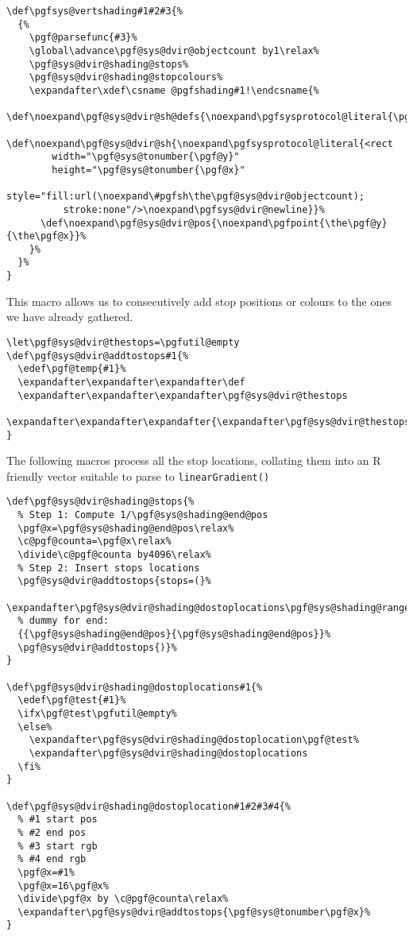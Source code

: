 \documentclass[]{article}
\begin{document}
\begin{verbatim}
\def\pgfsys@vertshading#1#2#3{%
  {%
    \pgf@parsefunc{#3}%
    \global\advance\pgf@sys@dvir@objectcount by1\relax%
    \pgf@sys@dvir@shading@stops%
    \pgf@sys@dvir@shading@stopcolours%
    \expandafter\xdef\csname @pgfshading#1!\endcsname{%
      \def\noexpand\pgf@sys@dvir@sh@defs{\noexpand\pgfsysprotocol@literal{\pgf@sys@dvir@thestops}}%
      \def\noexpand\pgf@sys@dvir@sh{\noexpand\pgfsysprotocol@literal{<rect
        width="\pgf@sys@tonumber{\pgf@y}"
        height="\pgf@sys@tonumber{\pgf@x}"
        style="fill:url(\noexpand\#pgfsh\the\pgf@sys@dvir@objectcount);
          stroke:none"/>\noexpand\pgfsys@dvir@newline}}%
      \def\noexpand\pgf@sys@dvir@pos{\noexpand\pgfpoint{\the\pgf@y}{\the\pgf@x}}%
    }%
  }%
}
\end{verbatim}

This macro allows us to consecutively add stop positions or colours to
the ones we have already gathered.

\begin{verbatim}
\let\pgf@sys@dvir@thestops=\pgfutil@empty
\def\pgf@sys@dvir@addtostops#1{%
  \edef\pgf@temp{#1}%
  \expandafter\expandafter\expandafter\def
  \expandafter\expandafter\expandafter\pgf@sys@dvir@thestops
  \expandafter\expandafter\expandafter{\expandafter\pgf@sys@dvir@thestops\expandafter\space\pgf@temp}%
}
\end{verbatim}

The following macros process all the stop locations, collating them into
an R friendly vector suitable to parse to \texttt{linearGradient()}

\begin{verbatim}
\def\pgf@sys@dvir@shading@stops{%
  % Step 1: Compute 1/\pgf@sys@shading@end@pos
  \pgf@x=\pgf@sys@shading@end@pos\relax%
  \c@pgf@counta=\pgf@x\relax%
  \divide\c@pgf@counta by4096\relax%
  % Step 2: Insert stops locations 
  \pgf@sys@dvir@addtostops{stops=(}%
  \expandafter\pgf@sys@dvir@shading@dostoplocations\pgf@sys@shading@ranges%
  % dummy for end:
  {{\pgf@sys@shading@end@pos}{\pgf@sys@shading@end@pos}}%
  \pgf@sys@dvir@addtostops{)}%
}

\def\pgf@sys@dvir@shading@dostoplocations#1{%
  \edef\pgf@test{#1}%
  \ifx\pgf@test\pgfutil@empty%
  \else%
    \expandafter\pgf@sys@dvir@shading@dostoplocation\pgf@test%
    \expandafter\pgf@sys@dvir@shading@dostoplocations
  \fi%
}

\def\pgf@sys@dvir@shading@dostoplocation#1#2#3#4{%
  % #1 start pos
  % #2 end pos
  % #3 start rgb
  % #4 end rgb
  \pgf@x=#1%
  \pgf@x=16\pgf@x%
  \divide\pgf@x by \c@pgf@counta\relax%
  \expandafter\pgf@sys@dvir@addtostops{\pgf@sys@tonumber\pgf@x}%
}
\end{verbatim}
\end{document}
